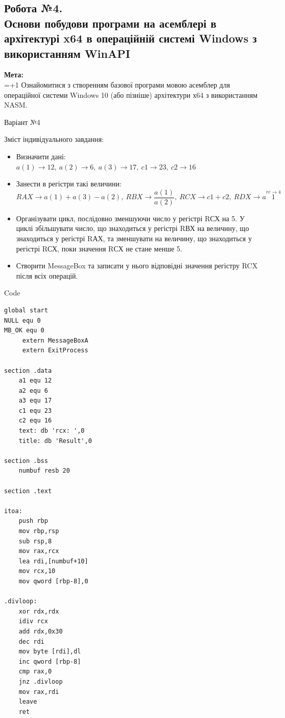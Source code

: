 \documentclass[a4paper,12pt]{article}
\begin{document}
\newpage
    \begin{center}
        \section*{\bfseries{Робота №4.\\
        Основи побудови програми на асемблері в архітектурі x64 в операційній
        системі Windows з використанням WinAPI
    }}
    \end{center}
    \textbf{Мета:} \\
    \hangindent=1.5cm 
    \hangafter=+1 \noindent
    Ознайомитися з створенням базової програми мовою асемблер для
    операційної системи Windows 10 (або пізніше) архітектури х64 з використанням
    NASM. \\
    \begin{center}
        \Large{Варіант №4}
    \end{center}
    Зміст індивідуального завдання:
    \begin{itemize}
        \item Визначити дані: \\
        $a(1) \rightarrow 12,\: 
        a(2) \rightarrow 6,\: 
        a(3) \rightarrow 17,\: 
        c1 \rightarrow 23,\: 
        c2 \rightarrow 16$
        \item Занести в регістри такі величини: \\
        $RAX \rightarrow a(1) + a(3) - a(2),\:
        RBX \rightarrow \dfrac{a(1)}{a(2)},\:
        RCX \rightarrow c1+c2,\:
        RDX \rightarrow a\stackrel{rc\rightarrow 4}{1}$
        \item Організувати цикл, послідовно зменшуючи число у регістрі RСХ на 5. У
        циклі збільшувати число, що знаходиться у регістрі RВХ на величину, що
        знаходиться у регістрі RАХ, та зменшувати на величину, що знаходиться у
        регістрі RСХ, поки значення RСХ не стане менше 5.
        \item Створити MessageBox та записати у нього відповідні значення регістру RCX після всіх
        операцій.
    \end{itemize}

\newpage
    \begin{center}
        \Large{Code}
    \end{center}
    \begin{lstlisting}[language=assembler]
global start
NULL equ 0
MB_OK equ 0
     extern MessageBoxA
     extern ExitProcess

section .data
    a1 equ 12
    a2 equ 6
    a3 equ 17
    c1 equ 23
    c2 equ 16
    text: db 'rcx: ',0
    title: db 'Result',0

section .bss
    numbuf resb 20

section .text

itoa:
    push rbp
    mov rbp,rsp
    sub rsp,8
    mov rax,rcx
    lea rdi,[numbuf+10]
    mov rcx,10
    mov qword [rbp-8],0

.divloop:
    xor rdx,rdx
    idiv rcx
    add rdx,0x30
    dec rdi
    mov byte [rdi],dl
    inc qword [rbp-8]
    cmp rax,0
    jnz .divloop
    mov rax,rdi
    leave
    ret
    \end{lstlisting}
\end{document}
